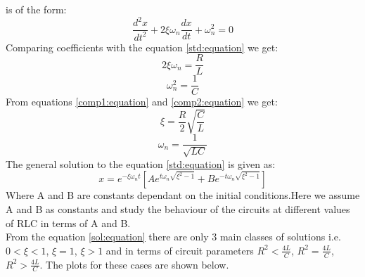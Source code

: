 \documentclass[12pt,a4paper]{report}
\begin{document}
is of the form:
\begin{equation}
\frac{d^2x}{dt^2}+2\xi \omega_n\frac{dx}{dt}+\omega_n ^2=0
\label{std:equation}
\end{equation}
Comparing coefficients with the equation \textcolor{blue}{\ref{std:equation}} we get:
\begin{equation}
2\xi\omega_n=\frac{R}{L}
\label{comp1:equation}
\end{equation}
\begin{equation}
\omega_n ^2=\frac{1}{C}
\label{comp2:equation}
\end{equation}
From equations \textcolor{blue}{\ref{comp1:equation}} and \textcolor{blue}{\ref{comp2:equation}} we get:
\begin{equation}
\xi=\frac{R}{2}\sqrt{\frac{C}{L}}
\label{compres1:equation}
\end{equation}
\begin{equation}
\omega_n=\frac{1}{\sqrt{LC}}
\label{compres2:equation}
\end{equation}
The general solution to the equation \textcolor{blue}{\ref{std:equation}} is given as:
\begin{equation}
x=e^{-\xi\omega_nt} [Ae^{t\omega_n\sqrt{\xi^2 - 1}}+Be^{-t\omega_n\sqrt{\xi^2 - 1}}]
\label{sol:equation}
\end{equation}
Where A and B are constants dependant on the initial conditions.Here we assume A and B as constants
and study the behaviour of the circuits at different values of RLC in terms of A and B.\\ From the equation
\textcolor{blue}{\ref{sol:equation}} there are only 3 main classes of solutions i.e. $0<\xi<1$, $\xi=1$, $\xi>1$
and in terms of circuit parameters $R^2<\frac{4L}{C}$, $R^2=\frac{4L}{C}$, $R^2>\frac{4L}{C}$. The plots for
these cases are shown below.
\end{document}
